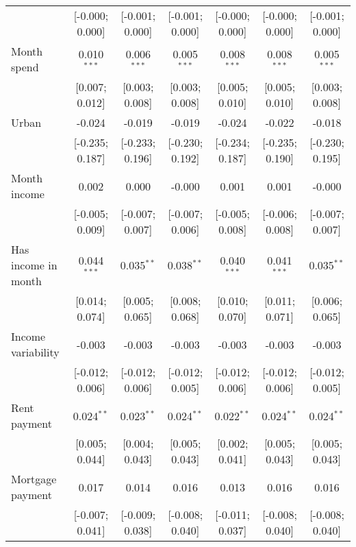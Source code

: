 \begin{table}[htbp]
\begin{threeparttable}[b]
\begin{tabular}{lcccccc}
                                   & [-0.000; 0.000] & [-0.001; 0.000]  & [-0.001; 0.000] & [-0.000; 0.000] & [-0.000; 0.000] & [-0.001; 0.000]\\   
         Month spend               & 0.010$^{***}$   & 0.006$^{***}$    & 0.005$^{***}$   & 0.008$^{***}$   & 0.008$^{***}$   & 0.005$^{***}$\\   
                                   & [0.007; 0.012]  & [0.003; 0.008]   & [0.003; 0.008]  & [0.005; 0.010]  & [0.005; 0.010]  & [0.003; 0.008]\\   
         Urban                     & -0.024          & -0.019           & -0.019          & -0.024          & -0.022          & -0.018\\   
                                   & [-0.235; 0.187] & [-0.233; 0.196]  & [-0.230; 0.192] & [-0.234; 0.187] & [-0.235; 0.190] & [-0.230; 0.195]\\   
         Month income              & 0.002           & 0.000            & -0.000          & 0.001           & 0.001           & -0.000\\   
                                   & [-0.005; 0.009] & [-0.007; 0.007]  & [-0.007; 0.006] & [-0.005; 0.008] & [-0.006; 0.008] & [-0.007; 0.007]\\   
         Has income in month       & 0.044$^{***}$   & 0.035$^{**}$     & 0.038$^{**}$    & 0.040$^{***}$   & 0.041$^{***}$   & 0.035$^{**}$\\   
                                   & [0.014; 0.074]  & [0.005; 0.065]   & [0.008; 0.068]  & [0.010; 0.070]  & [0.011; 0.071]  & [0.006; 0.065]\\   
         Income variability        & -0.003          & -0.003           & -0.003          & -0.003          & -0.003          & -0.003\\   
                                   & [-0.012; 0.006] & [-0.012; 0.006]  & [-0.012; 0.005] & [-0.012; 0.006] & [-0.012; 0.006] & [-0.012; 0.005]\\   
         Rent payment              & 0.024$^{**}$    & 0.023$^{**}$     & 0.024$^{**}$    & 0.022$^{**}$    & 0.024$^{**}$    & 0.024$^{**}$\\   
                                   & [0.005; 0.044]  & [0.004; 0.043]   & [0.005; 0.043]  & [0.002; 0.041]  & [0.005; 0.043]  & [0.005; 0.043]\\   
         Mortgage payment          & 0.017           & 0.014            & 0.016           & 0.013           & 0.016           & 0.016\\   
                                   & [-0.007; 0.041] & [-0.009; 0.038]  & [-0.008; 0.040] & [-0.011; 0.037] & [-0.008; 0.040] & [-0.008; 0.040]\\   

\end{tabular}
\end{threeparttable}
\end{table}
